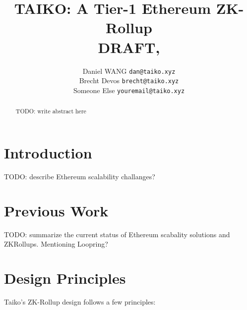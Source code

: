 \documentclass[9pt,oneside]{amsart}
\title[TAIKO: A Tier-1 Ethereum ZK-Rollup\\ \smaller
\textbf{{DRAFT}}]{TAIKO: A Tier-1 Ethereum ZK-Rollup \\ \smaller \textbf{{DRAFT, \thedate}}}
\author{
  Daniel WANG \texttt{dan@taiko.xyz} \\
  Brecht Devos \texttt{brecht@taiko.xyz}\\
  Someone Else \texttt{youremail@taiko.xyz}
}
\begin{document}
\pagecolor{pagecolor}

\begin{abstract}
\color{brown}
TODO: write abstract here
\color{black}

\end{abstract}

\maketitle

\setlength{\columnsep}{20pt}
\begin{multicols}{2}


\section{Introduction}

\color{brown}
TODO: describe Ethereum scalability challanges?

\color{black}

\section{Previous Work}

\color{brown}
TODO: summarize the current status of Ethereum scabality solutions and ZKRollups. Mentioning Loopring?

\color{black}

\section{Design Principles}

Taiko's ZK-Rollup design follows a few principles:


\end{multicols}
\end{document}
